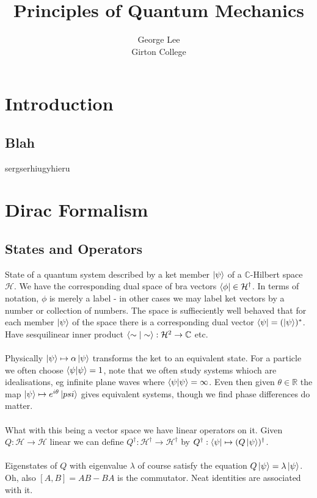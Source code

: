 \documentclass{article}
\title{Principles of Quantum Mechanics}
\author{George Lee\\Girton College}
\begin{document}
\maketitle
\section{Introduction}
\subsection{Blah}
sergserhiugyhieru
\section{Dirac Formalism}
\subsection{States and Operators}
State of a quantum system described by a ket member $\ket{\psi}$ of a $\mathbb{C}$-Hilbert space $\mathcal{H}$.  We have the corresponding dual space of bra vectors $\bra{\phi}\in\mathcal{H}^\dagger$.  In terms of notation, $\phi$ is merely a label - in other cases we may label ket vectors by a number or collection of numbers.  The space is suffieciently well behaved that for each member $\ket{\psi}$ of the space there is a corresponding dual vector $\bra{\psi}=(\ket{\psi})^*$.  Have sesquilinear inner product $\braket{\sim|\sim}:\mathcal{H}^2\rightarrow\mathbb{C}$ etc.
\\
\\
Physically $\ket{\psi}\mapsto\alpha\ket{\psi}$ transforms the ket to an equivalent state.  For a particle we often choose $\braket{\psi|\psi}=1$, note that we often study systems whioch are idealisations, eg infinite plane waves where $\braket{\psi|\psi}=\infty$.  Even then given $\theta\in\mathbb{R}$ the map $\ket{\psi}\mapsto e^{i\theta}\ket{psi}$ gives equivalent systems, though we find phase differences do matter.
\\
\\
What with this being a vector space we have linear operators on it.  Given $Q:\mathcal{H}\rightarrow\mathcal{H}$ linear we can define $Q^\dagger:\mathcal{H}^\dagger\rightarrow\mathcal{H}^\dagger$ by $Q^\dagger:\bra{\psi}\mapsto(Q\ket{\psi})^\dagger$.
\\
\\
Eigenstates of $Q$ with eigenvalue $\lambda$ of course satisfy the equation $Q\ket{\psi}=\lambda\ket{\psi}$.  Oh, also $[A,B]=AB-BA$ is the commutator.  Neat identities are associated with it.
\end{document}
